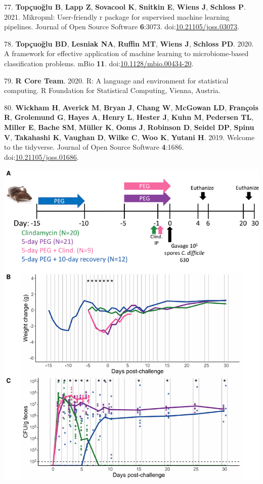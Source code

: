\documentclass[
  11pt,
]{article}
\begin{document}
\leavevmode\hypertarget{ref-Topcuoglu2021}{}%
77. \textbf{Topçuoğlu B}, \textbf{Lapp Z}, \textbf{Sovacool K},
\textbf{Snitkin E}, \textbf{Wiens J}, \textbf{Schloss P}. 2021.
Mikropml: User-friendly r package for supervised machine learning
pipelines. Journal of Open Source Software \textbf{6}:3073.
doi:\href{https://doi.org/10.21105/joss.03073}{10.21105/joss.03073}.

\leavevmode\hypertarget{ref-Topcuoglu2020}{}%
78. \textbf{Topçuoğlu BD}, \textbf{Lesniak NA}, \textbf{Ruffin MT},
\textbf{Wiens J}, \textbf{Schloss PD}. 2020. A framework for effective
application of machine learning to microbiome-based classification
problems. mBio \textbf{11}.
doi:\href{https://doi.org/10.1128/mbio.00434-20}{10.1128/mbio.00434-20}.

\leavevmode\hypertarget{ref-r_citation_2020}{}%
79. \textbf{R Core Team}. 2020. R: A language and environment for
statistical computing. R Foundation for Statistical Computing, Vienna,
Austria.

\leavevmode\hypertarget{ref-Tidyverse2019}{}%
80. \textbf{Wickham H}, \textbf{Averick M}, \textbf{Bryan J},
\textbf{Chang W}, \textbf{McGowan LD}, \textbf{François R},
\textbf{Grolemund G}, \textbf{Hayes A}, \textbf{Henry L}, \textbf{Hester
J}, \textbf{Kuhn M}, \textbf{Pedersen TL}, \textbf{Miller E},
\textbf{Bache SM}, \textbf{Müller K}, \textbf{Ooms J}, \textbf{Robinson
D}, \textbf{Seidel DP}, \textbf{Spinu V}, \textbf{Takahashi K},
\textbf{Vaughan D}, \textbf{Wilke C}, \textbf{Woo K}, \textbf{Yutani H}.
2019. Welcome to the tidyverse. Journal of Open Source Software
\textbf{4}:1686.
doi:\href{https://doi.org/10.21105/joss.01686}{10.21105/joss.01686}.

\newpage

\includegraphics{figure_1.pdf}
\end{document}
